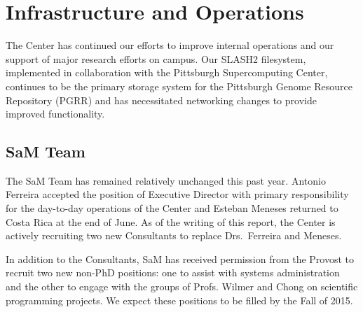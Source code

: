 \chapter{Infrastructure and Operations}
The Center has continued our efforts to improve internal operations and our
support of major research efforts on campus.  Our SLASH2 filesystem,
implemented in collaboration with the Pittsburgh Supercomputing Center, continues
to be the primary storage system for the Pittsburgh Genome Resource Repository
(PGRR) and has necessitated networking changes to provide improved
functionality.

\section{SaM Team}
The SaM Team has remained relatively unchanged this past year.  Antonio
Ferreira accepted the position of Executive Director with primary
responsibility for the day-to-day operations of the Center and Esteban Meneses
returned to Costa Rica at the end of June.  As of the writing of this report,
the Center is actively recruiting two new Consultants to replace Drs.\
Ferreira and Meneses.

In addition to the Consultants, SaM has received permission from the Provost
to recruit two new non-PhD positions: one to assist with systems
administration and the other to engage with the groups of Profs. Wilmer and Chong on scientific programming projects.  We expect these positions to be
filled by the Fall of 2015.

